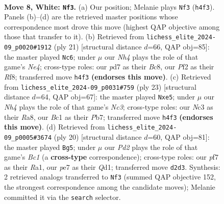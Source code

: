 \documentclass[11pt]{article}
\begin{document}
\clearpage

\begin{figure}[p]\centering
\begin{subfigure}{0.46\textwidth}\centering
\resizebox{\linewidth}{!}{%
\newchessgame
\chessboard[
  setfen={r1bq1rk1/pp1pppbp/5np1/2p5/2Pn3N/2N3P1/PP1PPPBP/R1BQ1RK1 w - - 6 8},
  showmover=false,
  pgfstyle=straightmove, color=movearrow, markmove={h4-f3}
]}
\caption{}
\end{subfigure}\hfill
\begin{subfigure}{0.46\textwidth}\centering
\resizebox{\linewidth}{!}{%
\newchessgame
\chessboard[
  setfen={r1bq1rk1/pp2ppbp/3p2p1/2n1n3/2P2N2/1PN3P1/P2BPPBP/R2Q1RK1 b - - 0 11},
  showmover=false,
  pgfstyle=straightmove, color=movearrow, markmove={e5-c6}
]}
\caption{}
\end{subfigure}
\\[4pt]
\begin{subfigure}{0.46\textwidth}\centering
\resizebox{\linewidth}{!}{%
\newchessgame
\chessboard[
  setfen={r1bq1rk1/pp3pbp/1nn3p1/3pP3/8/2N1PNP1/PP3PBP/R1BQ1RK1 b - - 0 12},
  showmover=false,
  pgfstyle=straightmove, color=movearrow, markmove={c6-e5}
]}
\caption{}
\end{subfigure}\hfill
\begin{subfigure}{0.46\textwidth}\centering
\resizebox{\linewidth}{!}{%
\newchessgame
\chessboard[
  setfen={r1b2rk1/ppp1qpbp/5np1/2n1p3/P1N5/2N3P1/1PP1PPBP/R1BQ1RK1 w - - 4 11},
  showmover=false,
  pgfstyle=straightmove, color=movearrow, markmove={c1-g5}
]}
\caption{}
\end{subfigure}
\caption{\textbf{Move 8, White: \texttt{Nf3}.} (a) Our position; Melanie plays \texttt{Nf3} (\texttt{h4f3}). Panels (b)--(d) are the retrieved master positions whose correspondence most drove this move (highest QAP objective among those that transfer to it). (b) Retrieved from \texttt{lichess\_elite\_2024-09\_p0020\#1912} (ply 21) [structural distance $d$=66, QAP obj=85]: the master played \texttt{Nc6}; under $\mu$ our \emph{Nh4} plays the role of that game's \emph{Ne4}; cross-type roles: our \emph{p}d7 as their \emph{B}c8, our \emph{P}f2 as their \emph{R}f8; transferred move \texttt{h4f3} \textbf{(endorses this move)}. (c) Retrieved from \texttt{lichess\_elite\_2024-09\_p0031\#759} (ply 23) [structural distance $d$=64, QAP obj=67]: the master played \texttt{Nxe5}; under $\mu$ our \emph{Nh4} plays the role of that game's \emph{Nc3}; cross-type roles: our \emph{N}c3 as their \emph{R}a8, our \emph{B}c1 as their \emph{P}b7; transferred move \texttt{h4f3} \textbf{(endorses this move)}. (d) Retrieved from \texttt{lichess\_elite\_2024-09\_p0005\#3674} (ply 20) [structural distance $d$=60, QAP obj=81]: the master played \texttt{Bg5}; under $\mu$ our \emph{Pd2} plays the role of that game's \emph{Bc1} (a \textbf{cross-type} correspondence); cross-type roles: our \emph{p}f7 as their \emph{R}a1, our \emph{p}e7 as their \emph{Q}d1; transferred move \texttt{d2d3}. Synthesis: 2 retrieved analogs transferred to \texttt{Nf3} (summed QAP objective 152, the strongest correspondence among the candidate moves); Melanie committed it via the \texttt{search} selector.}
\label{fig:thought-m14}
\end{figure}
\end{document}
